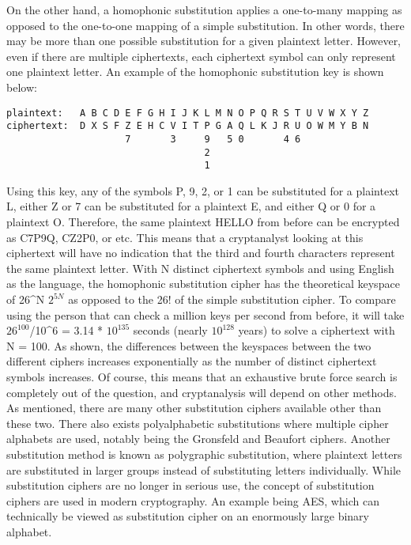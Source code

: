 \documentclass[a4paper,twoside,10pt]{report}
\begin{document}
On the other hand, a homophonic substitution applies a one-to-many mapping as opposed to the one-to-one mapping of a simple substitution. In other words, there may be more than one possible substitution for a given plaintext letter. However, even if there are multiple ciphertexts, each ciphertext symbol can only represent one plaintext letter. An example of the homophonic substitution key is shown below:

\begin{lstlisting}
plaintext:   A B C D E F G H I J K L M N O P Q R S T U V W X Y Z
ciphertext:  D X S F Z E H C V I T P G A Q L K J R U O W M Y B N
                     7       3     9   5 0       4 6            
                                   2                    
                                   1
\end{lstlisting}

\vspace{4mm}
Using this key, any of the symbols P, 9, 2, or 1 can be substituted for a plaintext L, either Z or 7 can be substituted for a plaintext E, and either Q or 0 for a plaintext O. Therefore, the same plaintext HELLO from before can be encrypted as C7P9Q, CZ2P0, or etc. This means that a cryptanalyst looking at this ciphertext will have no indication that the third and fourth characters represent the same plaintext letter. With N distinct ciphertext symbols and using English as the language, the homophonic substitution cipher has the theoretical keyspace of 26^N \approx \hspace{2mm} $2^{5N}$ as opposed to the 26! of the simple substitution cipher. To compare using the person that can check a million keys per second from before, it will take $26^{100}$/10^6 = 3.14 \hspace{1mm} * \hspace{1mm}  $10^{135}$ seconds (nearly $10^{128}$ years) to solve a ciphertext with N = 100. As shown, the differences between the keyspaces between the two different ciphers increases exponentially as the number of distinct ciphertext symbols increases. Of course, this means that an exhaustive brute force search is completely out of the question, and cryptanalysis will depend on other methods. \\

As mentioned, there are many other substitution ciphers available other than these two. There also exists polyalphabetic substitutions where multiple cipher alphabets are used, notably being the Gronsfeld and Beaufort ciphers. Another substitution method is known as polygraphic substitution, where plaintext letters are substituted in larger groups instead of substituting letters individually. While substitution ciphers are no longer in serious use, the concept of substitution ciphers are used in modern cryptography. An example being AES, which can technically be viewed as substitution cipher on an enormously large binary alphabet.
\end{document}
